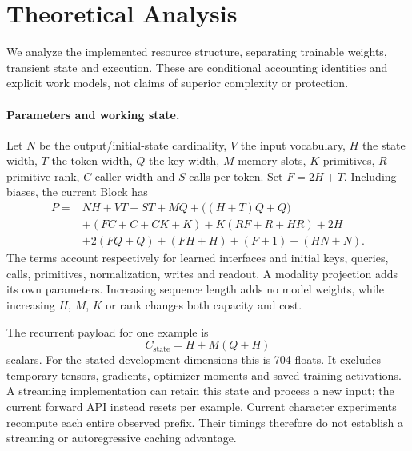 \section{Theoretical Analysis}
\label{sec:theory-main}

We analyze the implemented resource structure, separating trainable weights,
transient state and execution. These are conditional accounting identities
and explicit work models, not claims of superior complexity or protection.

\paragraph{Parameters and working state.}
Let $N$ be the output/initial-state cardinality, $V$ the input vocabulary,
$H$ the state width, $T$ the token width, $Q$ the key width, $M$ memory slots,
$K$ primitives, $R$ primitive rank, $C$ caller width and $S$ calls per token.
Set $F=2H+T$. Including biases, the current Block has
\begin{align}
 P={}&NH+VT+ST+MQ+\big((H+T)Q+Q\big)\nonumber\\
    &+(FC+C+CK+K)+K(RF+R+HR)+2H\nonumber\\
    &+2(FQ+Q)+(FH+H)+(F+1)+(HN+N).
 \label{eq:main-continuous-parameters}
\end{align}
The terms account respectively for learned interfaces and initial keys,
queries, calls, primitives, normalization, writes and readout. A modality
projection adds its own parameters. Increasing sequence length adds no model
weights, while increasing $H$, $M$, $K$ or rank changes both capacity and cost.

The recurrent payload for one example is
\begin{equation}
 C_{\mathrm{state}}=H+M(Q+H)
\end{equation}
scalars. For the stated development dimensions this is 704 floats. It excludes
temporary tensors, gradients, optimizer moments and saved training activations.
A streaming implementation can retain this state and process a new input;
the current forward API instead resets per example. Current character
experiments recompute each entire observed prefix. Their timings therefore
do not establish a streaming or autoregressive caching advantage.

